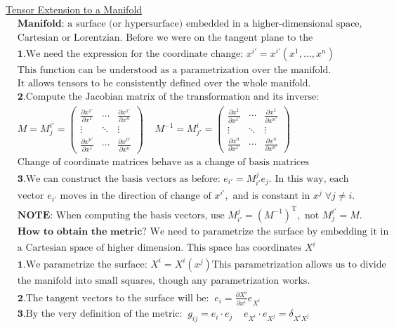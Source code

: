 \underline{Tensor Extension to a Manifold}
\begin{align*}
&\textbf{Manifold: } \text{a surface (or hypersurface) embedded in a higher-dimensional space,} \\
&\text{Cartesian or Lorentzian. Before we were on the tangent plane to the manifold.}\\
&\textbf{1.} \text{We need the expression for the coordinate change: } x^{i'} = x^{i'}(x^1, \dots, x^n) \\
&\text{This function can be understood as a parametrization over the manifold.} \\
&\text{It allows tensors to be consistently defined over the whole manifold.} \\
&\textbf{2.} \text{Compute the Jacobian matrix of the transformation and its inverse:} \\
&M= M^{i'}_j  =
\begin{pmatrix} 
\frac{\partial x^{1'}}{\partial x^1} & \cdots & \frac{\partial x^{1'}}{\partial x^n} \\
\!\!\vdots\!\! & \!\ddots\! & \!\!\vdots\!\! \\ 
\frac{\partial x^{n'}}{\partial x^1} & \cdots & \frac{\partial x^{n'}}{\partial x^n} 
\end{pmatrix} 
\;\;\;\;
M^{-1}= M^i_{j'}= 
\begin{pmatrix} 
\frac{\partial x^1}{\partial x^{1'}} & \cdots & \frac{\partial x^1}{\partial x^{n'}} \\ 
\!\!\vdots \!\!& \!\ddots \!& \!\!\vdots\!\! \\ 
\frac{\partial x^n}{\partial x^{1'}} & \cdots & \frac{\partial x^n}{\partial x^{n'}} 
\end{pmatrix} \\
&\text{Change of coordinate matrices behave as a change of basis matrices}\\
&\textbf{3.} \text{We can construct the basis vectors as before: } 
e_{i'} = M^{j}_{i'} e_j. \text{ In this way, each} \\
& \text{vector } e_{i'} \text{ moves in the direction of change of } x^{i'}\!, 
\text{ and is constant in } x^{j} \; \forall j \neq i. \\
&\textbf{NOTE:} 
\text{ When computing the basis vectors, use } M^j_{i'} = (M^{-1})^\mathrm{T}, \text{ not } M^{i'}_j = M.\\
&\textbf{How to obtain the metric?} \text{ We need to parametrize the surface by embedding it in} \\
&\text{a Cartesian space of higher dimension. This space has coordinates } X^i \\
&\textbf{1.} \text{We parametrize the surface: }X^i = X^i(x^j) \text{This parametrization allows us to divide}\\
&\text{the manifold into small squares, though any parametrization works.} \\
&\textbf{2.} \text{The tangent vectors to the surface will be:} \;\;  e_i = \tfrac{\partial X^i}{\partial x^i} e_{X^i} \\
&\textbf{3.} \text{By the very definition of the metric:} \;\;  g_{ij} = e_i \cdot e_j \;\; \;\; e_{X^i}\cdot e_{X^j} = \delta_{X^iX^j}
\end{align*}

